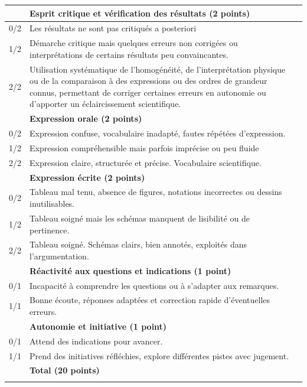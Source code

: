 \documentclass[a4paper,12pt,french]{article}
\begin{document}
\begin{scriptsize}
\begin{center}
\begin{tabular}{|p{}|p{}|p{}|}
	& \textbf{Esprit critique et vérification des résultats (2 points)} & \\ \hline
	0/2 & Les résultats ne sont pas critiqués a posteriori & \\ \hline
	1/2 & Démarche critique mais quelques erreurs non corrigées ou interprétations de certains résultats peu convaincantes. & \\ \hline
	2/2 & Utilisation systématique de l'homogénéité, de l'interprétation physique ou de la comparaison à des expressions ou des ordres de grandeur connus, permettant de corriger certaines erreurs en autonomie ou d'apporter un éclaircissement scientifique. & \\ \hline
	
	& \textbf{Expression orale (2 points)} & \\ \hline
	0/2 & Expression confuse, vocabulaire inadapté, fautes répétées d'expression. & \\ \hline
	1/2 & Expression compréhensible mais parfois imprécise ou peu fluide & \\ \hline
	2/2 & Expression claire, structurée et précise. Vocabulaire scientifique. & \\ \hline
	
	& \textbf{Expression écrite (2 points)} & \\ \hline
	0/2 & Tableau mal tenu, absence de figures, notations incorrectes ou dessins inutilisables. & \\ \hline
	1/2 & Tableau soigné mais les schémas manquent de lisibilité ou de pertinence. & \\ \hline
	2/2 & Tableau soigné. Schémas clairs, bien annotés, exploités dans l'argumentation. & \\ \hline
	
	& \textbf{Réactivité aux questions et indications (1 point)} & \\ \hline
	0/1 & Incapacité à comprendre les questions ou à s'adapter aux remarques. & \\ \hline
	1/1 & Bonne écoute, réponses adaptées et correction rapide d'éventuelles erreurs. & \\ \hline
	
	& \textbf{Autonomie et initiative (1 point)} & \\ \hline
	0/1 & Attend des indications pour avancer. & \\ \hline
	1/1 & Prend des initiatives réfléchies, explore différentes pistes avec jugement. & \\ \hline
	
	& \textbf{Total (20 points)} & \\
	& & \\ \hline
\end{tabular} 
\end{center}
\end{scriptsize}
\end{document}
